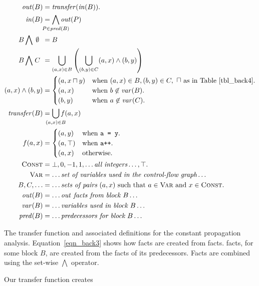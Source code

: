 \documentclass[12pt]{report}
\begin{document}
\begin{myfig}[tbph]
\begin{align}
  \outBa &= \mathit{transfer}(\inBa). \label{eqn_back3} \\
  \inBa &= \bigwedge\limits_{\mathclap{P \in \mathit{pred}(B)}} \outXa{P} \\ 
  B \bigwedge\ \,\mathclap{\emptyset}\phantom{C} &= B \notag\\
  B \bigwedge\ \,\mathclap{C}\phantom{C} &= \bigcup\limits_{(a,x) \in B}
                    \left(\bigcup\limits_{(b,y) \in C} (a,x) \wedge (b,y)\right) \\ 
  (a,x) \wedge (b,y) &= 
  \begin{cases}
    (a,x \lub y) & \text{when}\ (a,x) \in B, (b,y) \in C,\ \text{\lub as in Table~\ref{tbl_back4}.}\\
    (a,x) & \text{when}\ b \not\in \mathit{var}(B). \\
    (b,y) & \text{when}\ a \not\in \mathit{var}(C). \\
  \end{cases} \\ 
  \mathit{transfer}(B) &= \bigcup\limits_{\mathclap{(a,x) \in B}} f(a,x) \\
  f (a,x) &= 
  \begin{cases}
    (a,y) & \text{when \texttt{a = y}}. \\
    (a,\top) & \text{when \texttt{a++}}. \\
    (a,x) & \text{otherwise}. \\
  \end{cases} \\
  \setLC &= \bot, 0, -1, 1, \dots \text{\it all integers} \dots, \top. \notag\\
  \setL{Var} &= \dots \text{\it set of variables used in the control-flow graph} \dots \notag\\
  B, C, \dots &= \dots \text{\it sets of pairs}\ (a, x)\ \text{such that}\ a \in 
    \setL{Var}\ \text{and}\ x \in \setLC. \notag\\
  \mathit{out}(B) &= \dots \text{\it \out facts from block $B$}\dots \notag\\
  \mathit{var}(B) &= \dots \text{\it variables used in block $B$}\dots \notag\\
  \mathit{pred}(B) &= \dots \text{\it predecessors for block $B$}\dots \notag
\end{align}
\caption{The transfer function and associated definitions for the constant
  propagation analysis. Equation~\eqref{eqn_back3} shows how \out facts are
  created from \inE facts. \InBa facts, for some block $B$, are created from
  the \outBa facts of its predecessors. Facts are combined using the set-wise
  $\bigwedge$ operator.}
\label{back_fig10}
\end{myfig}
 Our transfer function creates 
\end{document}
